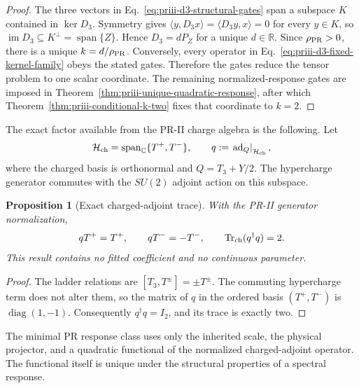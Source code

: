 \documentclass[11pt]{article}
\newtheorem{proposition}[theorem]{Proposition}
\begin{document}
\begin{proof}
The three vectors in Eq.~\eqref{eq:priii-d3-structural-gates} span a subspace \(K\) contained in
\(\ker D_3\).  Symmetry gives
\(\langle y,D_3x\rangle=\langle D_3y,x\rangle=0\) for every \(y\in K\), so
\(\operatorname{im}D_3\subseteq K^\perp=\operatorname{span}\{Z\}\).  Hence \(D_3=dP_Z\) for a
unique \(d\in\mathbb R\).  Since \(\rho_{\rm PR}>0\), there is a unique
\(k=d/\rho_{\rm PR}\).  Conversely, every operator in
Eq.~\eqref{eq:priii-d3-fixed-kernel-family} obeys the stated gates.  Therefore
the gates reduce the tensor problem to one scalar coordinate.  The remaining
normalized-response gates are imposed in
Theorem~\ref{thm:priii-unique-quadratic-response}, after which
Theorem~\ref{thm:priii-conditional-k-two} fixes that coordinate to \(k=2\).
\end{proof}

The exact factor available from the PR-II charge algebra is the following.  Let
\begin{equation}
\mathcal H_{\rm ch}
=
\operatorname{span}_{\mathbb C}\{T^+,T^-\},
\qquad
q
:=
\left.\operatorname{ad}_Q\right|_{\mathcal H_{\rm ch}},
\label{eq:priii-charged-adjoint-definition}
\end{equation}
where the charged basis is orthonormal and \(Q=T_3+Y/2\).  The hypercharge generator commutes
with the \(SU(2)\) adjoint action on this subspace.

\begin{proposition}[Exact charged-adjoint trace]
\label{prop:priii-exact-charged-adjoint-trace}
With the PR-II generator normalization,
\begin{equation}
qT^+=T^+,
\qquad
qT^-=-T^-,
\qquad
\operatorname{Tr}_{\rm ch}(q^\dagger q)=2.
\label{eq:priii-exact-group-factor-two}
\end{equation}
This result contains no fitted coefficient and no continuous parameter.
\end{proposition}

\begin{proof}
The ladder relations are \([T_3,T^\pm]=\pm T^\pm\).  The commuting hypercharge term does not
alter them, so the matrix of \(q\) in the ordered basis \((T^+,T^-)\) is
\(\operatorname{diag}(1,-1)\).  Consequently \(q^\dagger q=I_2\), and its trace is exactly two.
\end{proof}

The minimal PR response class uses only the inherited scale, the physical
projector, and a quadratic functional of the normalized charged-adjoint
operator.  The functional itself is unique under the structural properties of
a spectral response.
\end{document}
